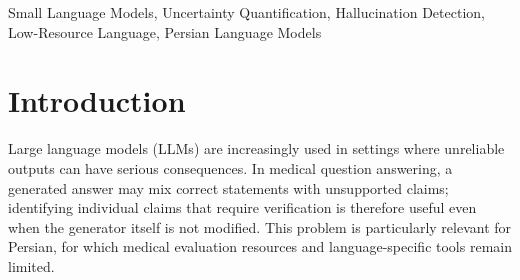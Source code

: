 \documentclass[conference,a4paper]{IEEEtran}
\begin{document}
\begin{abstract}
Hallucination detection is important for medical language models because fluent answers can contain unsupported claims. Repeated-sampling methods estimate uncertainty by generating several answers to the same question and comparing them, but this requires multiple completions. We adapt the LLM Uncertainty Head (LUH) framework to Persian medical language models derived from Aya-Expanse-8B and construct two paired, claim-level uncertainty datasets in Persian. Each dataset contains 1,600 responses generated by Gaokerena-V or Gaokerena-R. The selected question inventory is disease-heavy: 80.6\% of entities come from the disease list and 19.4\% from a combined anatomy, laboratory-test, and procedure block; specialty-level labels are unavailable. The heads use internal attention and token-probability signals associated with one response to estimate claim-level hallucination risk. Two medical experts independently reviewed a 200-claim sample and could consult medical sources; their three-way agreement was 91.5\% (Cohen's $\kappa=0.855$). On the held-out response splits, the heads achieve PR-AUCs of 0.4820 and 0.4652 and ROC-AUCs of 0.7852 and 0.7810, respectively. We also measure five-run answer variability for Aya-Expanse-8B and its two evaluated Persian medical derivatives on a 168-question medical examination. The observed differences caution against assuming that medical adaptation or shared model lineage guarantees response consistency.
\end{abstract}

\begin{IEEEkeywords}

Small Language Models, Uncertainty Quantification, Hallucination Detection, Low-Resource Language, Persian Language Models

\end{IEEEkeywords}

\section{Introduction}
Large language models (LLMs) are increasingly used in settings where unreliable outputs can have serious consequences. In medical question answering, a generated answer may mix correct statements with unsupported claims; identifying individual claims that require verification is therefore useful even when the generator itself is not modified. This problem is particularly relevant for Persian, for which medical evaluation resources and language-specific tools remain limited.
\end{document}
